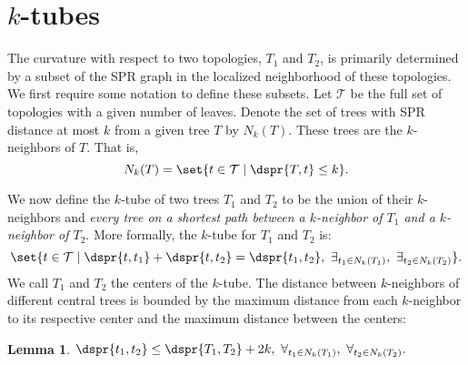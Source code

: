 \documentclass{amsart}
\newtheorem{lemma}[theorem]{Lemma}
\newcommand{\TT}{\mathcal T}
\begin{document}
\section{$k$-tubes}

The curvature with respect to two topologies, $T_1$ and $T_2$, is primarily determined by a subset of the SPR graph in the localized neighborhood of these topologies.
We first require some notation to define these subsets.
Let $\TT$ be the full set of topologies with a given number of leaves.
Denote the set of trees with SPR distance at most $k$ from a given tree $T$ by $N_k(T)$.
These trees are the $k$-neighbors of $T$.
That is, $$ N_k(T) = \set{t \in \TT \mid \dspr{T, t} \le k} .$$

We now define the $k$-tube of two trees $T_1$ and $T_2$ to be the union of their $k$-neighbors and \emph{every tree on a shortest path between a $k$-neighbor of $T_1$ and a $k$-neighbor of $T_2$}.
More formally, the $k$-tube for $T_1$ and $T_2$ is:
\[ \set{t \in \TT \mid \dspr{t, t_1} + \dspr{t, t_2} = \dspr{t_1, t_2},\ \exists_{t_1 \in N_k(T_1)},\ \exists_{t_2 \in N_k(T_2)} } .\]
We call $T_1$ and $T_2$ the centers of the $k$-tube.
The distance between $k$-neighbors of different central trees is bounded by the maximum distance from each $k$-neighbor to its respective center and the maximum distance between the centers:

\begin{lemma}
	\label{lem:neighbor_distance}
	$\dspr{t_1, t_2} \le \dspr{T_1, T_2} + 2k,\ \forall_{t_1 \in N_k(T_1)},\ \forall_{t_2 \in N_k(T_2)}.$
\end{lemma}
\end{document}
